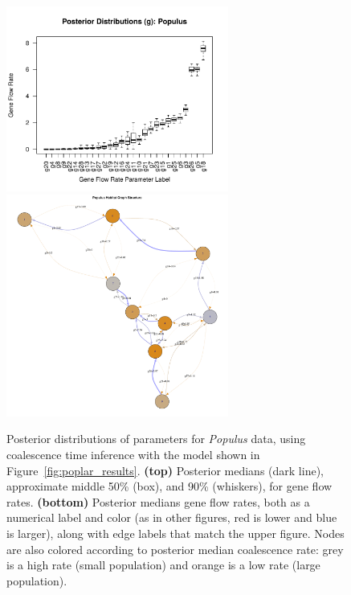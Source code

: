 \documentclass{article}
\begin{document}
\begin{figure}
\centering
    \includegraphics[width=0.65\textwidth]{poplars/posterior_dists_g_populus}
    \includegraphics[width=0.65\textwidth]{poplars/grid_populus}
    \caption{
        Posterior distributions of parameters for \textit{Populus} data,
        using coalescence time inference with the model shown in Figure~\ref{fig:poplar_results}.
        \textbf{(top)} Posterior medians (dark line),
        approximate middle 50\% (box), and 90\% (whiskers),
        for gene flow rates.
        \textbf{(bottom)} Posterior medians gene flow rates, 
        both as a numerical label and color
        (as in other figures, red is lower and blue is larger),
        along with edge labels that match the upper figure.
        Nodes are also colored according to posterior median coalescence rate:
        grey is a high rate (small population)
        and orange is a low rate (large population).
        \label{sfig:poplar_g}
    }
\end{figure}
\end{document}
